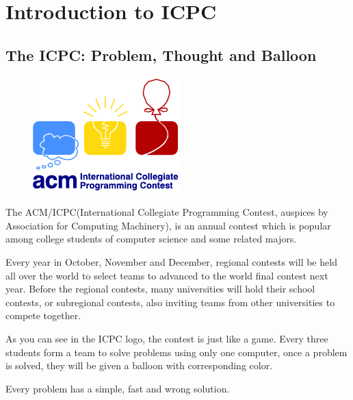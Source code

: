 \section{Introduction to ICPC}

\subsection{The ICPC: Problem, Thought and Balloon}
\begin{figure}
	\vspace{-20pt}
	\begin{center}
		\includegraphics{./images/icpc_logo.png}
	\end{center}
\end{figure}

The ACM/ICPC(International Collegiate Programming Contest,
auspices by Association for Computing Machinery), is an annual contest
which is popular among college students of computer science and some related majors.

Every year in October, November and December, regional contests will be held all over the world
to select teams to advanced to the world final contest next year.
Before the regional contests, many universities will hold their school contests,
or subregional contests, also inviting teams from other universities to compete together.

As you can see in the ICPC logo, the contest is just like a game.
Every three students form a team to solve problems using only one computer,
once a problem is solved, they will be given a balloon with corresponding color.

Every problem has a simple, fast and wrong solution.

